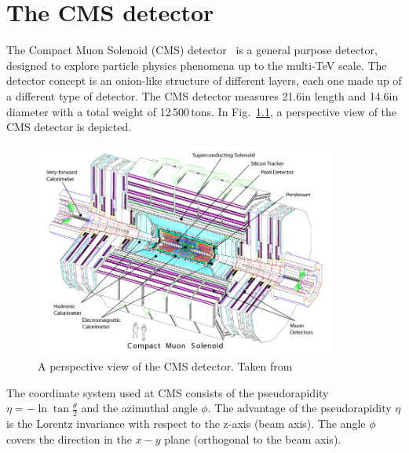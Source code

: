 \FloatBarrier
\chapter{The CMS detector}
The Compact Muon Solenoid (CMS) detector~\cite{bib:CMS:experiment,bib:CMS:TDR} is a general purpose detector, designed to explore particle physics phenomena up to the multi-TeV scale.
The detector concept is an onion-like structure of different layers, each one made up of a different type of detector. 
The CMS detector measures 21.6\m in length and 14.6\m in diameter with a total weight of 12\,500\,tons.
In Fig.~\ref{fig:CMSdetector}, a perspective view of the CMS detector is depicted. 
\begin{figure}[!b]
  \centering
      \includegraphics[width=0.89\textwidth]{figures/experiment/CMS/cms_complete_labelled.png}
  \caption{A perspective view of the CMS detector. Taken from~\cite{bib:CMS:experiment}}  
  \label{fig:CMSdetector}
\end{figure}

The coordinate system used at CMS consists of the pseudorapidity $\eta = -\ln \tan{\frac{\theta}{2}}$ and the azimuthal angle $\phi$.
The advantage of the pseudorapidity $\eta$ is the Lorentz invariance with respect to the z-axis (beam axis).
The angle $\phi$ covers the direction in the $x-y$ plane (orthogonal to the beam axis).


